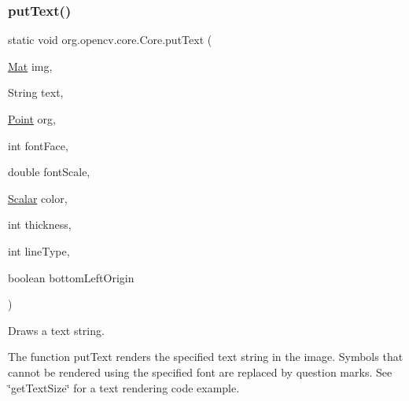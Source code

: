 \subsubsection{\texorpdfstring{put\+Text()}{putText()}\hspace{0.1cm}{\footnotesize\ttfamily [1/3]}}
{\footnotesize\ttfamily static void org.\+opencv.\+core.\+Core.\+put\+Text (\begin{DoxyParamCaption}\item[{\mbox{\hyperlink{classorg_1_1opencv_1_1core_1_1_mat}{Mat}}}]{img,  }\item[{String}]{text,  }\item[{\mbox{\hyperlink{classorg_1_1opencv_1_1core_1_1_point}{Point}}}]{org,  }\item[{int}]{font\+Face,  }\item[{double}]{font\+Scale,  }\item[{\mbox{\hyperlink{classorg_1_1opencv_1_1core_1_1_scalar}{Scalar}}}]{color,  }\item[{int}]{thickness,  }\item[{int}]{line\+Type,  }\item[{boolean}]{bottom\+Left\+Origin }\end{DoxyParamCaption})\hspace{0.3cm}{\ttfamily [static]}}

Draws a text string.

The function {\ttfamily put\+Text} renders the specified text string in the image. Symbols that cannot be rendered using the specified font are replaced by question marks. See \char`\"{}get\+Text\+Size\char`\"{} for a text rendering code example.


